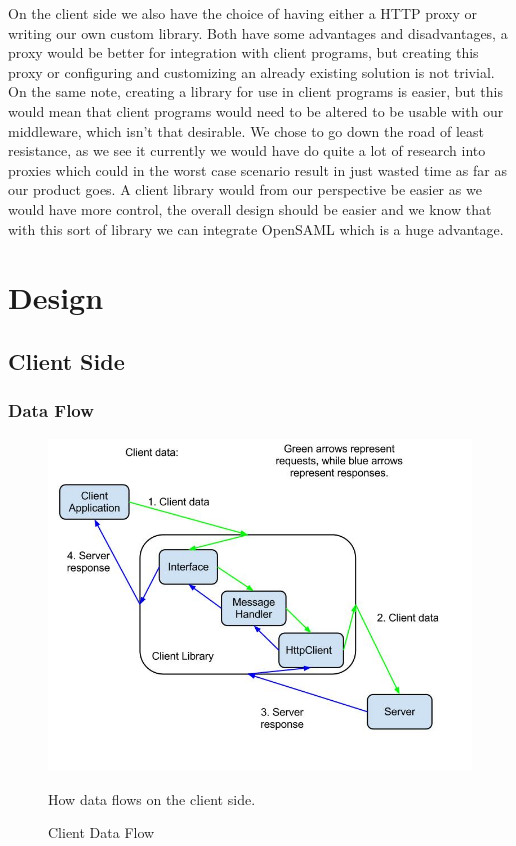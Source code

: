 \documentclass[12pt]{article}
\begin{document}
        On the client side we also have the choice of having either a HTTP proxy or writing our own custom library. Both have some advantages and disadvantages, a proxy would be better for integration with client programs, but creating this proxy or configuring and customizing an already existing solution is not trivial. On the same note, creating a library for use in client programs is easier, but this would mean that client programs would need to be altered to be usable with our middleware, which isn’t that desirable. We chose to go down the road of least resistance, as we see it currently we would have do quite a lot of research into proxies which could in the worst case scenario result in just wasted time as far as our product goes. A client library would from our perspective be easier as we would have more control, the overall design should be easier and we know that with this sort of library we can integrate OpenSAML which is a huge advantage.  
              
\section{Design}\label{design}
    \subsection{Client Side}\label{clientdesign}
        \subsubsection{Data Flow}\label{dataflow}
            \begin{figure}[htb]
            \centering
            \includegraphics[scale=0.5]{client_data_flow}
            \caption{Client Data Flow}
            How data flows on the client side.
            \label{fig:clientdata}
        \end{figure}
        
\end{document}
